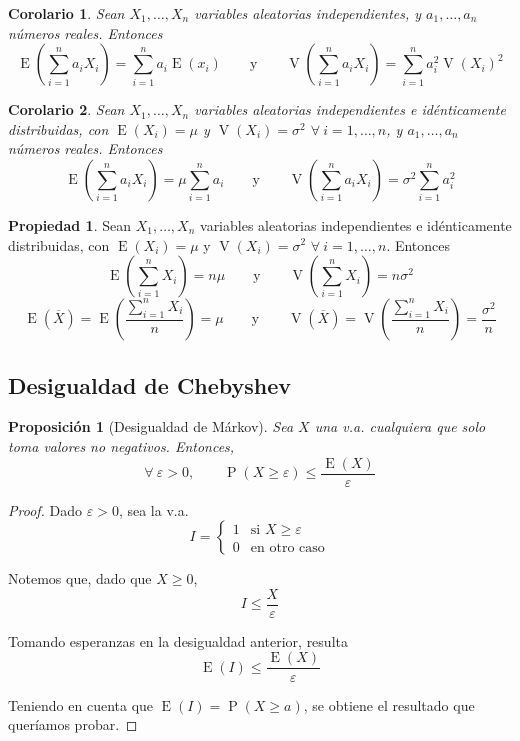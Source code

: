 \documentclass[11pt]{article}
\theoremstyle{plain}
\newtheorem*{pro}{Proposición}
\newtheorem*{corol}{Corolario}
\theoremstyle{definition}
\newtheorem*{prop}{Propiedad}
\theoremstyle{remark}
\newcommand{\proba}{\ensuremath{\operatorname{P}}}  %
\newcommand{\esp}[0]{\ensuremath{\operatorname{E}}}  %
\newcommand{\var}[0]{\ensuremath{\operatorname{V}}}  %
\newcommand{\foralle}{\ensuremath{\forall \ }}  %
\begin{document}
      \begin{corol}
        Sean $X_1,\dots,X_n$ variables aleatorias independientes, y $a_1,\dots,a_n$ números reales. Entonces
        \[ \esp\left( \sum_{i=1}^n a_i X_i \right) = \sum_{i=1}^n a_i \esp(x_i) \qquad \text{y} \qquad \var\left( \sum_{i=1}^n a_i X_i \right) = \sum_{i=1}^n a_i^2 \var(X_i)^2\]
      \end{corol}

      \begin{corol}
        Sean $X_1,\dots,X_n$ variables aleatorias independientes e idénticamente distribuidas, con $\esp(X_i) = \mu$ y $\var(X_i) = \sigma^2$ $\foralle i = 1, \dots, n$, y $a_1,\dots,a_n$ números reales. Entonces
        \[ \esp\left( \sum_{i=1}^n a_i X_i \right) = \mu \sum_{i=1}^n a_i \qquad \text{y} \qquad \var\left( \sum_{i=1}^n a_i X_i \right) = \sigma^2 \sum_{i=1}^n a_i^2 \]
      \end{corol}

      \begin{prop}
        Sean $X_1,\dots,X_n$ variables aleatorias independientes e idénticamente distribuidas, con $\esp(X_i) = \mu$ y $\var(X_i) = \sigma^2$ $\foralle i = 1, \dots, n$. Entonces
          \[ \esp\left( \sum_{i=1}^n X_i \right) = n \mu \qquad \text{y} \qquad \var\left( \sum_{i=1}^n X_i \right) = n \sigma^2 \]
          \[ \esp\left( \overline{X} \right) = \esp\left( \frac{\sum_{i=1}^n X_i}{n} \right) = \mu \qquad \text{y} \qquad \var\left( \overline{X} \right) = \var\left( \frac{\sum_{i=1}^n X_i}{n} \right) = \frac{\sigma^2}{n} \]
      \end{prop}

  \subsection{Desigualdad de Chebyshev}
    \begin{pro}[Desigualdad de Márkov]
      Sea $X$ una v.a. cualquiera que solo toma valores no negativos. Entonces,
      \[ \foralle \varepsilon > 0, \qquad \proba(X \geq \varepsilon) \leq \frac{\esp(X)}{\varepsilon} \]
    \end{pro}

    \begin{proof}
      Dado $\varepsilon > 0$, sea la v.a.
      \[ I = \begin{cases}
        1 & \text{si $X \geq \varepsilon$} \\
        0 & \text{en otro caso}
      \end{cases} \]

      Notemos que, dado que $X \geq 0$,
      \[ I \leq \frac{X}{\varepsilon} \]

      Tomando esperanzas en la desigualdad anterior, resulta
      \[ \esp(I) \leq \frac{\esp(X)}{\varepsilon} \]

      Teniendo en cuenta que $\esp(I) = \proba(X \geq a)$, se obtiene el resultado que queríamos probar.
    \end{proof}
\end{document}
